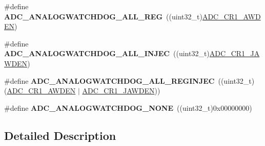 \begin{DoxyCompactItemize}
\item 
\#define {\bfseries A\+D\+C\+\_\+\+A\+N\+A\+L\+O\+G\+W\+A\+T\+C\+H\+D\+O\+G\+\_\+\+A\+L\+L\+\_\+\+R\+EG}~((uint32\+\_\+t)\hyperlink{group___peripheral___registers___bits___definition_ga6e006d43fcb9fe1306745c95a1bdd651}{A\+D\+C\+\_\+\+C\+R1\+\_\+\+A\+W\+D\+EN})\hypertarget{group___a_d_c__analog__watchdog__selection_gad9d25140644089dd34084cb4dfa7ebd8}{}\label{group___a_d_c__analog__watchdog__selection_gad9d25140644089dd34084cb4dfa7ebd8}

\item 
\#define {\bfseries A\+D\+C\+\_\+\+A\+N\+A\+L\+O\+G\+W\+A\+T\+C\+H\+D\+O\+G\+\_\+\+A\+L\+L\+\_\+\+I\+N\+J\+EC}~((uint32\+\_\+t)\hyperlink{group___peripheral___registers___bits___definition_ga4886de74bcd3a1e545094089f76fd0b3}{A\+D\+C\+\_\+\+C\+R1\+\_\+\+J\+A\+W\+D\+EN})\hypertarget{group___a_d_c__analog__watchdog__selection_gacf2ee0d67e728fd6258270b239823713}{}\label{group___a_d_c__analog__watchdog__selection_gacf2ee0d67e728fd6258270b239823713}

\item 
\#define {\bfseries A\+D\+C\+\_\+\+A\+N\+A\+L\+O\+G\+W\+A\+T\+C\+H\+D\+O\+G\+\_\+\+A\+L\+L\+\_\+\+R\+E\+G\+I\+N\+J\+EC}~((uint32\+\_\+t)(\hyperlink{group___peripheral___registers___bits___definition_ga6e006d43fcb9fe1306745c95a1bdd651}{A\+D\+C\+\_\+\+C\+R1\+\_\+\+A\+W\+D\+EN} $\vert$ \hyperlink{group___peripheral___registers___bits___definition_ga4886de74bcd3a1e545094089f76fd0b3}{A\+D\+C\+\_\+\+C\+R1\+\_\+\+J\+A\+W\+D\+EN}))\hypertarget{group___a_d_c__analog__watchdog__selection_ga8ab72f0e7dfee943acb5cccacff7e4a0}{}\label{group___a_d_c__analog__watchdog__selection_ga8ab72f0e7dfee943acb5cccacff7e4a0}

\item 
\#define {\bfseries A\+D\+C\+\_\+\+A\+N\+A\+L\+O\+G\+W\+A\+T\+C\+H\+D\+O\+G\+\_\+\+N\+O\+NE}~((uint32\+\_\+t)0x00000000)\hypertarget{group___a_d_c__analog__watchdog__selection_gad173f9dd01d4585c9b7c8c324de399c0}{}\label{group___a_d_c__analog__watchdog__selection_gad173f9dd01d4585c9b7c8c324de399c0}

\end{DoxyCompactItemize}


\subsection{Detailed Description}
